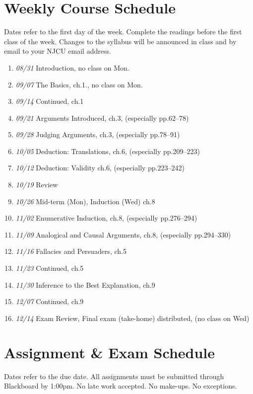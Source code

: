\documentclass[11pt,article,oneside]{memoir}
\begin{document}
\section{Weekly Course Schedule}
Dates refer to the first day of the week. Complete the readings before the first class of the week.  Changes to the syllabus will be announced in class and by email to your NJCU email address.\begin{enumerate}
\item \textit{08/31} Introduction,  no class on Mon.
\item \textit{09/07} The Basics,  ch.1., no class on Mon.
\item \textit{09/14} Continued, ch.1 
\item \textit{09/21} Arguments Introduced, ch.3, (especially pp.62--78)
\item \textit{09/28} Judging Arguments, ch.3, (especially pp.78--91)
\item \textit{10/05} Deduction: Translations, ch.6, (especially pp.209--223)
\item \textit{10/12} Deduction: Validity ch.6, (especially pp.223--242)
\item \textit{10/19} Review
\item \textit{10/26} Mid-term (Mon), Induction (Wed) ch.8
\item \textit{11/02} Enumerative Induction, ch.8, (especially pp.276--294)
\item \textit{11/09} Analogical and Causal Arguments, ch.8, (especially pp.294--330)
\item \textit{11/16} Fallacies and Persuaders, ch.5
 \item \textit{11/23} Continued, ch.5
 \item \textit{11/30} Inference to the Best Explanation, ch.9
\item \textit{12/07} Continued,  ch.9
\item \textit{12/14} Exam Review, Final exam (take-home) distributed, (no class on Wed)
\end{enumerate}


\section{Assignment \& Exam Schedule}
Dates refer to the due date. All assignments must be submitted through Blackboard by 1:00pm. No late work accepted. No make-ups. No exceptions. 
\end{document}
